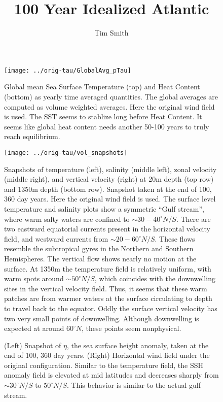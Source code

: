 \documentclass[a4paper,11pt]{article}
\title{\vspace{-10ex}100 Year Idealized Atlantic}
\author{Tim Smith}
\date{\vspace{-3ex}}
\begin{document}
 


\begin{figure}
\centering
\texttt{[image: ../orig-tau/GlobalAvg\_pTau]}
\caption{Global mean Sea Surface Temperature (top) and Heat Content (bottom) as yearly time averaged quantities. The global averages are computed as volume weighted averages. Here the original wind field is used. The SST seems to stablize long before Heat Content. It seems like global heat content needs another 50-100 years to truly reach equilibrium. }
\label{fig:globalAvgs}
\end{figure}

\begin{figure}
\centering
\texttt{[image: ../orig-tau/vol\_snapshots]}
\caption{Snapshots of temperature (left), salinity (middle left), zonal velocity (middle right), and vertical velocity (right) at 20m depth (top row) and 1350m depth (bottom row). Snapshot taken at the end of 100, 360 day years. Here the original wind field is used. The surface level temperature and salinity plots show a symmetric ``Gulf stream'', where warm salty waters are confined to $\sim 30-40^{\circ}N/S$. There are two eastward equatorial currents present in the horizontal velocity field, and westward currents from $\sim20-60^{\circ}N/S$. These flows resemble the subtropical gyres in the Northern and Southern Hemispheres. The vertical flow shows nearly no motion at the surface. At 1350m the temperature field is relatively uniform, with warm spots around $\sim50^{\circ}N/S$, which coincides with the downwelling sites in the vertical velocity field. Thus, it seems that these warm patches are from warmer waters at the surface circulating to depth to travel back to the equator. Oddly the surface vertical velocity has two very small points of downwelling. Although downwelling is expected at around $60^{\circ}N$, these points seem nonphysical.}
\label{fig:volSnaps}
\end{figure}

\begin{figure}
\centering
{}
\qquad
{}
\caption{(Left) Snapshot of $\eta$, the sea surface height anomaly, taken at the end of 100, 360 day years. (Right) Horizontal wind field under the original configuration. Similar to the temperature field, the SSH anomaly field is elevated at mid latitudes and decreases sharply from $\sim30^{\circ}N/S$ to $50^{\circ}N/S$. This behavior is similar to the actual gulf stream.} 
\label{fig:etaSnap}
\end{figure}
\end{document}
